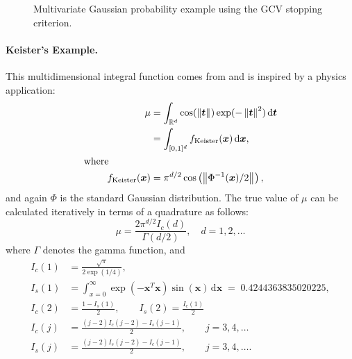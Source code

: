 \documentclass{svjour3}                     %
\newcommand{\bm}[1]{\boldsymbol{#1}}
\newcommand{\dif}[1]{\text{d}{#1}}
\newcommand{\reals}{\mathbb{R}}
\newcommand{\vt}{\bm{t}}
\newcommand{\vx}{\bm{x}}
\newcommand{\dvx}{\dif{\bm{x}}}
\newcommand{\dvt}{\dif{\bm{t}}}
\newcommand{\norm}[2][{}]{\ensuremath{\left \lVert #2 \right \rVert}_{#1}}
\begin{document}
\begin{figure}
	\caption[MVN guaranteed : GCV]{Multivariate Gaussian probability example using the GCV stopping criterion.}
	\label{fig:mvn-guaranteed-GCV}
\end{figure}

\paragraph{Keister's Example.}

This multidimensional integral function comes from \cite{Kei96} and is inspired by a physics application:
\begin{align*}
\mu & =  \int_{\reals^d} \cos(\norm{ \vt}) \exp(-\norm{ \vt }^2) \, \dvt \\
\nonumber
& = \int_{[0,1]^d} f_{\textup{Keister}}(\vx) \, \dvx,\\
\text{where } \qquad \qquad & \\
f_\textup{Keister}(\vx) &= \pi^{d/2} \cos\left(\norm{ \Phi^{-1}(\vx)/2}\right)  ,
\end{align*}
and again $\Phi$ is the standard Gaussian distribution.
The true value of $\mu$ can be calculated iteratively in terms of a quadrature as follows:  
\begin{equation*}
\mu = \frac{2 \pi^{d/2} I_c(d)}{\Gamma(d/2)}, \quad d=1,2, \ldots
\end{equation*}
where $\Gamma$ denotes the gamma function, and
\begin{align*}
I_c(1) &= \frac{\sqrt{\pi}}{2 \exp(1/4)}, 
\\
I_s(1) &= \int_{x=0}^\infty \exp(-\vx^T\vx)\sin(\vx) \, \dvx 
\; = \;  0.4244363835020225,
\\
I_c(2) &= \frac{1-I_s(1)}{2}, \qquad
I_s(2) = \frac{I_c(1)}{2}
\\
I_c(j) &= \frac{(j-2)I_c(j-2)-I_s(j-1)}{2},
\qquad j =3,4,\ldots
\\
I_s(j) &= \frac{(j-2)I_s(j-2)-I_c(j-1)}{2},
\qquad j =3,4,\ldots.
\end{align*}
\end{document}
